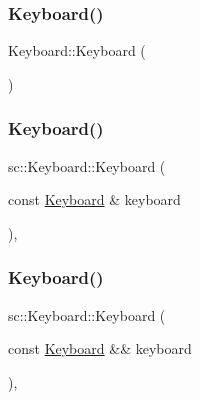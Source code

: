 \subsubsection{\texorpdfstring{Keyboard()}{Keyboard()}\hspace{0.1cm}{\footnotesize\ttfamily [1/3]}}
{\footnotesize\ttfamily Keyboard\+::\+Keyboard (\begin{DoxyParamCaption}{ }\end{DoxyParamCaption})\hspace{0.3cm}{\ttfamily [private]}}

\mbox{\label{classsc_1_1_keyboard_a2916c770f969b5138536d6bb9fe61fa2}} 
\subsubsection{\texorpdfstring{Keyboard()}{Keyboard()}\hspace{0.1cm}{\footnotesize\ttfamily [2/3]}}
{\footnotesize\ttfamily sc\+::\+Keyboard\+::\+Keyboard (\begin{DoxyParamCaption}\item[{const \mbox{\hyperlink{classsc_1_1_keyboard}{Keyboard}} \&}]{keyboard }\end{DoxyParamCaption})\hspace{0.3cm}{\ttfamily [private]}, {\ttfamily [delete]}}

\mbox{\label{classsc_1_1_keyboard_a1cbcf356385e1c21756116c02fd561ae}} 
\subsubsection{\texorpdfstring{Keyboard()}{Keyboard()}\hspace{0.1cm}{\footnotesize\ttfamily [3/3]}}
{\footnotesize\ttfamily sc\+::\+Keyboard\+::\+Keyboard (\begin{DoxyParamCaption}\item[{const \mbox{\hyperlink{classsc_1_1_keyboard}{Keyboard}} \&\&}]{keyboard }\end{DoxyParamCaption})\hspace{0.3cm}{\ttfamily [private]}, {\ttfamily [delete]}}



